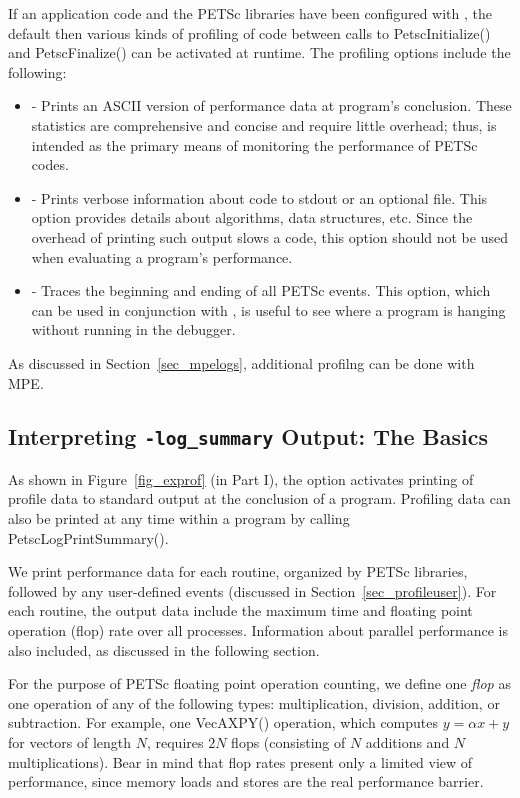 If an application code and the PETSc libraries have been configured with
, the default
then various kinds of profiling of code between calls to PetscInitialize() and PetscFinalize() can be 
activated at runtime.  The profiling options include the following:
 
\begin{itemize}
\item {} - Prints an ASCII version of performance data
     at program's conclusion. These statistics are comprehensive and concise
     and require little overhead; thus,  is intended as
     the primary means of monitoring the performance of PETSc codes.
\item {} - Prints verbose information about code to
     stdout or an optional file. This option provides details about algorithms,
     data structures, etc. Since the overhead of printing such output slows a
     code, this option should not be used when evaluating a program's performance.
\item {} - Traces the beginning and ending of all
     PETSc events.  This option, which can be used in conjunction with 
     , is useful to see where a program is hanging
     without running in the debugger.  
\end{itemize}
 As discussed in Section~\ref{sec_mpelogs},
additional profilng can be done with MPE.

\subsection{Interpreting {\tt -log\_summary} Output: The Basics}
\label{sec_ploginfo}

As shown in Figure~\ref{fig_exprof} (in Part I), the option   activates printing of profile
data to standard output at the conclusion of a program.  Profiling
data can also be printed at any time within a program by calling PetscLogPrintSummary().

We print performance data for each routine, organized by PETSc
libraries, followed by any user-defined events (discussed in
Section~\ref{sec_profileuser}).  For each routine, the output data
include the maximum time and floating point operation (flop) rate over
all processes.  Information about parallel performance is also
included, as discussed in the following section.

For the purpose of PETSc floating point operation counting, we define
one {\em flop} as one operation of any of the following types:
multiplication, division, addition, or subtraction.  For example, one
VecAXPY() operation, which computes $y = \alpha x + y$ for
vectors of length $N$, requires $2N$ flops (consisting of $N$
additions and $N$ multiplications).  Bear in mind that flop rates
present only a limited view of performance, since memory loads and stores are
the real performance barrier.


